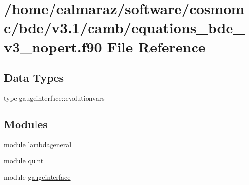 \hypertarget{equations__bde__v3__nopert_8f90}{}\section{/home/ealmaraz/software/cosmomc/bde/v3.1/camb/equations\+\_\+bde\+\_\+v3\+\_\+nopert.f90 File Reference}
\label{equations__bde__v3__nopert_8f90}
\subsection*{Data Types}
\begin{DoxyCompactItemize}
\item 
type \mbox{\hyperlink{structgaugeinterface_1_1evolutionvars}{gaugeinterface\+::evolutionvars}}
\end{DoxyCompactItemize}
\subsection*{Modules}
\begin{DoxyCompactItemize}
\item 
module \mbox{\hyperlink{namespacelambdageneral}{lambdageneral}}
\item 
module \mbox{\hyperlink{namespacequint}{quint}}
\item 
module \mbox{\hyperlink{namespacegaugeinterface}{gaugeinterface}}
\end{DoxyCompactItemize}
